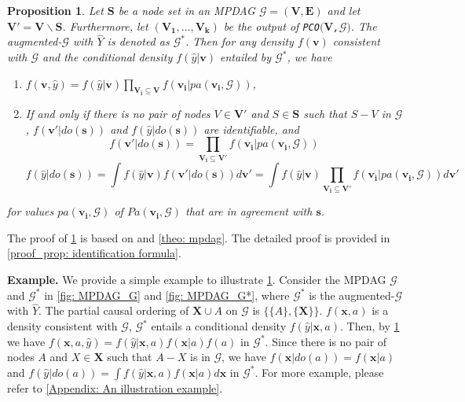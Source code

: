 \documentclass{article} %
\newtheorem{proposition}{Proposition}[section]
\begin{document}
\begin{proposition} \label{prop: identification formula}
    Let $\mathbf{S}$ be a node set in an MPDAG $\mathcal{G}=(\mathbf{V},\mathbf{E})$ and let $\mathbf{V'}=\mathbf{V} \backslash \mathbf{S}$. Furthermore, let $(\mathbf{V_1,...,V_k})$ be the output of \texttt{PCO$(\mathbf{V}$,$\mathcal{G})$}. The augmented-$\mathcal{G}$ with $\hat{Y}$ is denoted as $\mathcal{G^*}$. Then for any density $f(\mathbf{v})$ consistent with $\mathcal{G}$ and the conditional density $f(\hat{y}|\mathbf{v})$ entailed by $\mathcal{G^{*}}$, we have
    \begin{enumerate}
        \item $f(\mathbf{v}, \hat{y}) = f(\hat{y}|\mathbf{v}) \prod_{\mathbf{V_{i}} \subseteq \mathbf{V}} f(\mathbf{v_{i}}|pa(\mathbf{v_{i}}, \mathcal{G}))$, 
        \item If and only if there is no pair of nodes $V \in \mathbf{V'}$ and $S \in \mathbf{S}$ such that $S-V$ in $\mathcal{G}$, $f(\mathbf{v'}|do(\mathbf{s}))$ and $f(\hat{y}|do(\mathbf{s}))$ are identifiable, and
        \begin{equation} \label{eq: identification on v}
        f(\mathbf{v'}|do(\mathbf{s})) 
        = \prod_{\mathbf{V_{i} \subseteq \mathbf{V'}}} f(\mathbf{v_i}|pa(\mathbf{v_i}, \mathcal{G}))
        \end{equation}
        \begin{equation} \label{eq: identification on augmented-G}
        f(\hat{y}|do(\mathbf{s})) 
        = \int f(\hat{y}|\mathbf{v})f(\mathbf{v'}|do(\mathbf{s})) d \mathbf{v'} 
        = \int f(\hat{y}|\mathbf{v}) \prod_{\mathbf{V_{i} \subseteq \mathbf{V'}}} f(\mathbf{v_i}|pa(\mathbf{v_i}, \mathcal{G})) d \mathbf{v'} 
        \end{equation}
    \end{enumerate}
    for values $pa(\mathbf{v_i}, \mathcal{G})$ of $Pa(\mathbf{v_i}, \mathcal{G})$ that are in agreement with $\mathbf{s}$.
\end{proposition}
The proof of \cref{prop: identification formula} is based on \citet[Theorem 3.6]{perkovic2020identifying} and \cref{theo: mpdag}. The detailed proof is provided in \cref{proof_prop: identification formula}.

\textbf{Example.} We provide a simple example to illustrate \cref{prop: identification formula}. Consider the MPDAG $\mathcal{G}$ and $\mathcal{G}^*$ in \cref{fig: MPDAG_G} and \cref{fig: MPDAG_G*}, where $\mathcal{G}^*$ is the augmented-$\mathcal{G}$ with $\hat{Y}$. The partial causal ordering of $\mathbf{X} \cup A$ on $\mathcal{G}$ is $\{\{A\}, \{\mathbf{X}\}\}$. $f(\mathbf{x}, a)$ is a density consistent with $\mathcal{G}$, $\mathcal{G^*}$ entails a conditional density $f(\hat{y}|\mathbf{x},a)$. Then, by \cref{prop: identification formula} we have $f(\mathbf{x}, a, \hat{y})=f(\hat{y}|\mathbf{x},a)f(\mathbf{x}|a)f(a)$ in $\mathcal{G^*}$. Since there is no pair of nodes $A$ and $X \in \mathbf{X}$ such that $A - X$ is in $\mathcal{G}$, we have $f(\mathbf{x}|do(a))=f(\mathbf{x}|a)$ and $f(\hat{y}|do(a))=\int f(\hat{y}|\mathbf{x},a)f(\mathbf{x}|a) d \mathbf{x}$ in $\mathcal{G^*}$. For more example, please refer to \cref{Appendix: An illustration example}.
\end{document}
